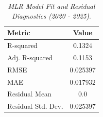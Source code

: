 \begin{table}[h]
  \centering
  \caption{\textit{MLR Model Fit and Residual Diagnostics (2020 - 2025)}.}
  \label{tab:mlrkpi20182025}
  \begin{tabular}{lc}
    \toprule
    \textbf{Metric} & \textbf{Value} \\ 
    \midrule
    R-squared & 0.1324 \\ 
    Adj. R-squared & 0.1153 \\ 
    RMSE & 0.025397 \\ 
    MAE & 0.017932 \\ 
    Residual Mean & 0.0 \\ 
    Residual Std. Dev. & 0.025397 \\ 
    \bottomrule
  \end{tabular}
\end{table}